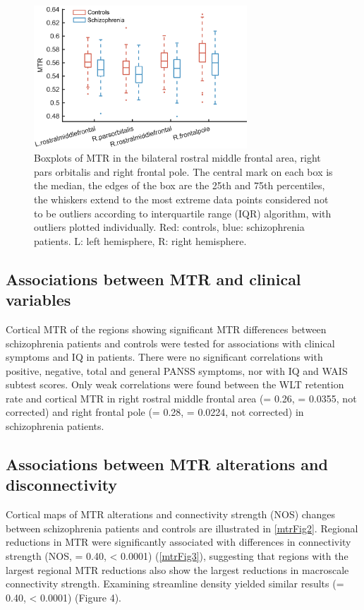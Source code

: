 \begin{refsection}
\begin{figure}[h]
    \centering
    \includegraphics[width=8cm]{images/mtrFig1.jpg}
    \caption{Boxplots of MTR in the bilateral rostral middle frontal area, right pars orbitalis and right frontal pole. The central mark on each box is the median, the edges of the box are the 25th and 75th percentiles, the whiskers extend to the most extreme data points considered not to be outliers according to interquartile range (IQR) algorithm, with outliers plotted individually. Red: controls, blue: schizophrenia patients. L: left hemisphere, R: right hemisphere.}
    \label{mtrFig1}
\end{figure}

\subsection*{Associations between MTR and clinical variables}
Cortical MTR of the regions showing significant MTR differences between schizophrenia patients and controls were tested for associations with clinical symptoms and IQ in patients. There were no significant correlations with positive, negative, total and general PANSS symptoms, nor with IQ and WAIS subtest scores. Only weak correlations were found between the WLT retention rate and cortical MTR in right rostral middle frontal area (\rval = 0.26, \pval = 0.0355, not corrected) and right frontal pole (\rval = 0.28, \pval = 0.0224, not corrected) in schizophrenia patients.

\subsection*{Associations between MTR alterations and disconnectivity}
Cortical maps of MTR alterations and connectivity strength (NOS) changes between schizophrenia patients and controls are illustrated in \ref{mtrFig2}. Regional reductions in MTR were significantly associated with differences in connectivity strength (NOS, \rval = 0.40, \pval < 0.0001) (\ref{mtrFig3}), suggesting that regions with the largest regional MTR reductions also show the largest reductions in macroscale connectivity strength. Examining streamline density yielded similar results (\rval = 0.40, \pval < 0.0001) (Figure 4).


\end{refsection}
